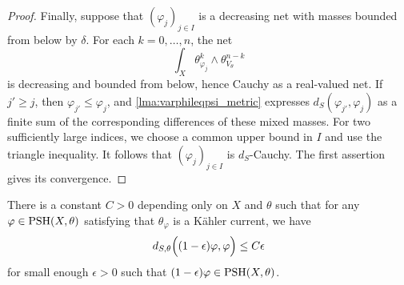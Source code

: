 \begin{proof}
    Finally, suppose that $(\varphi_j)_{j\in I}$ is a decreasing net with masses bounded from below by $\delta$. For each $k=0,\ldots,n$, the net
    \[
        \int_X\theta_{\varphi_j}^k\wedge\theta_{V_\theta}^{n-k}
    \]
    is decreasing and bounded from below, hence Cauchy as a real-valued net. If $j'\geq j$, then $\varphi_{j'}\leq\varphi_j$, and \cref{lma:varphileqpsi_metric} expresses $d_S(\varphi_{j'},\varphi_j)$ as a finite sum of the corresponding differences of these mixed masses. For two sufficiently large indices, we choose a common upper bound in $I$ and use the triangle inequality. It follows that $(\varphi_j)_{j\in I}$ is $d_S$-Cauchy. The first assertion gives its convergence.
\end{proof}

\begin{lemma}\label{lma:dSsmallmult}
    There is a constant $C>0$ depending only on $X$ and $\theta$ such that for any $\varphi\in \mathrm{PSH}(X,\theta)$ satisfying that $\theta_{\varphi}$ is a Kähler current, we have
        \[
        d_{S,\theta}\Bigl((1-\epsilon)\varphi,\varphi\Bigr)\leq C \epsilon
        \]
        for small enough $\epsilon>0$ such that $(1-\epsilon)\varphi\in \mathrm{PSH}(X,\theta)$.
    \end{lemma}
